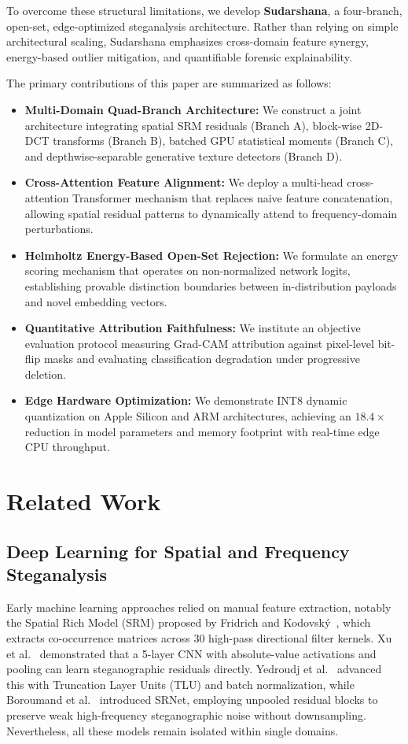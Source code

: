\documentclass[journal]{IEEEtran}
\begin{document}
To overcome these structural limitations, we develop \textbf{Sudarshana}, a four-branch, open-set, edge-optimized steganalysis architecture. Rather than relying on simple architectural scaling, Sudarshana emphasizes cross-domain feature synergy, energy-based outlier mitigation, and quantifiable forensic explainability. 

The primary contributions of this paper are summarized as follows:
\begin{itemize}
    \item \textbf{Multi-Domain Quad-Branch Architecture:} We construct a joint architecture integrating spatial SRM residuals (Branch A), block-wise 2D-DCT transforms (Branch B), batched GPU statistical moments (Branch C), and depthwise-separable generative texture detectors (Branch D).
    \item \textbf{Cross-Attention Feature Alignment:} We deploy a multi-head cross-attention Transformer mechanism that replaces naive feature concatenation, allowing spatial residual patterns to dynamically attend to frequency-domain perturbations.
    \item \textbf{Helmholtz Energy-Based Open-Set Rejection:} We formulate an energy scoring mechanism that operates on non-normalized network logits, establishing provable distinction boundaries between in-distribution payloads and novel embedding vectors.
    \item \textbf{Quantitative Attribution Faithfulness:} We institute an objective evaluation protocol measuring Grad-CAM attribution against pixel-level bit-flip masks and evaluating classification degradation under progressive deletion.
    \item \textbf{Edge Hardware Optimization:} We demonstrate INT8 dynamic quantization on Apple Silicon and ARM architectures, achieving an $18.4\times$ reduction in model parameters and memory footprint with real-time edge CPU throughput.
\end{itemize}

\section{Related Work}

\subsection{Deep Learning for Spatial and Frequency Steganalysis}
Early machine learning approaches relied on manual feature extraction, notably the Spatial Rich Model (SRM) proposed by Fridrich and Kodovsk{\'y}~\cite{fridrich2012rich}, which extracts co-occurrence matrices across 30 high-pass directional filter kernels. Xu et al.~\cite{xu2016structural} demonstrated that a 5-layer CNN with absolute-value activations and pooling can learn steganographic residuals directly. Yedroudj et al.~\cite{yedroudj2018net} advanced this with Truncation Layer Units (TLU) and batch normalization, while Boroumand et al.~\cite{boroumand2018deep} introduced SRNet, employing unpooled residual blocks to preserve weak high-frequency steganographic noise without downsampling. Nevertheless, all these models remain isolated within single domains.
\end{document}
